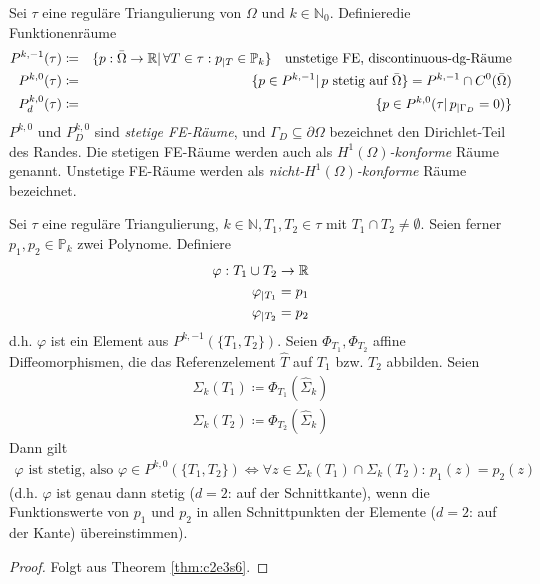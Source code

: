 \documentclass[../skript.tex]{subfiles}
\begin{document}
\begin{definition}\label{def:c2e3s8}
	Sei $\tau$ eine reguläre Triangulierung von $\Omega$ und $k\in\mathbb{N}_0$. Definieredie Funktionenräume
	\begin{eqnarray*}
		P^{k,-1}(\tau) &\coloneqq& \{p:\bar{\Omega}\to\mathbb{R}\vert\,\forall T\in\tau: p_{\vert T}\in\mathbb{P}_k\}\quad\text{unstetige FE, discontinuous-dg-Räume}\\
		P^{k,0}(\tau) &\coloneqq& \{p\in P^{k,-1}\vert\, p \text{ stetig auf } \bar{\Omega}\} = P^{k,-1}\cap C^0(\bar{\Omega})\\
		P^{k,0}_d(\tau) &\coloneqq& \{p\in P^{k,0}(\tau\vert\, p_{\vert\Gamma_D} = 0)\}
	\end{eqnarray*}
	$P^{k,0}$ und $P^{k,0}_D$ sind \emph{stetige FE-Räume}, und $\Gamma_D\subseteq\partial\Omega$ bezeichnet den Dirichlet-Teil des Randes. Die stetigen FE-Räume werden auch als \emph{$H^1(\Omega)$-konforme} Räume genannt. Unstetige FE-Räume werden als \emph{nicht-$H^1(\Omega)$-konforme} Räume bezeichnet.
\end{definition}

\begin{theorem}\label{thm:c2e3s9}
	Sei $\tau$ eine reguläre Triangulierung, $k\in\mathbb{N}, T_1,T_2\in\tau$ mit $T_1\cap T_2\not=\emptyset$. Seien ferner $p_1,p_2\in\mathbb{P}_k$  zwei Polynome. Definiere 
	\begin{eqnarray*}
		\varphi: T_1\cup T_2\to\mathbb{R}\\
		\varphi_{\vert T_1} = p_1\\
		\varphi_{\vert T_2} = p_2
	\end{eqnarray*}
	d.h. $\varphi$ ist ein Element aus $P^{k,-1}(\{T_1,T_2\})$. Seien $\Phi_{T_1},\Phi_{T_2}$ affine Diffeomorphismen, die das Referenzelement $\hat{T}$ auf $T_1$ bzw. $T_2$ abbilden. Seien 
	\begin{eqnarray*}
		\Sigma_k(T_1)\coloneqq\Phi_{T_1}\left(\hat{\Sigma}_k\right)\\
		\Sigma_k(T_2)\coloneqq\Phi_{T_2}\left(\hat{\Sigma}_k\right)		
	\end{eqnarray*} 
	Dann gilt
	\begin{eqnarray*}
		\varphi\text{ ist stetig, also } \varphi\in P^{k,0}(\{T_1,T_2\})
			\Leftrightarrow 
		\forall z\in\Sigma_k(T_1)\cap\Sigma_k(T_2):\,p_1(z) = p_2(z)
	\end{eqnarray*}
	(d.h. $\varphi$ ist genau dann stetig ($d=2$: auf der Schnittkante), wenn die Funktionswerte von $p_1$ und $p_2$ in allen Schnittpunkten der Elemente ($d=2$: auf der Kante) übereinstimmen).  
\end{theorem}
\begin{proof}
	Folgt aus Theorem \cref{thm:c2e3s6}.
\end{proof}
\end{document}
